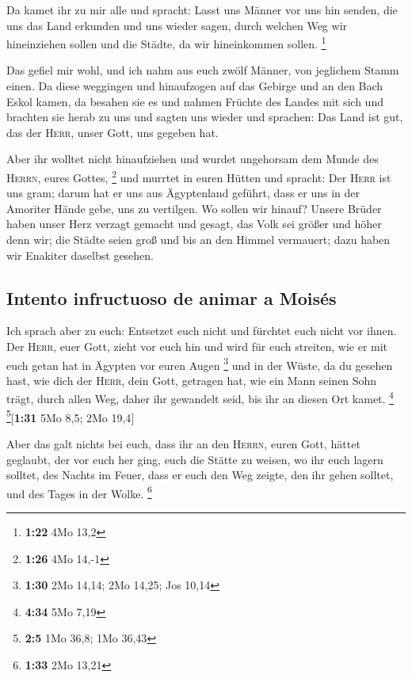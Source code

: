  Da kamet ihr zu mir alle und spracht: Lasst uns Männer
vor uns hin senden, die uns das Land erkunden und uns wieder sagen,
durch welchen Weg wir hineinziehen sollen und die Städte, da wir
hineinkommen sollen. \footnote{\textbf{1:22} 4Mo 13,2}

 Das gefiel mir wohl, und ich nahm aus euch zwölf Männer,
von jeglichem Stamm einen.  Da diese weggingen und
hinaufzogen auf das Gebirge und an den Bach Eskol kamen, da besahen sie
es  und nahmen Früchte des Landes mit sich und brachten
sie herab zu uns und sagten uns wieder und sprachen: Das Land ist gut,
das der \textsc{Herr}, unser Gott, uns gegeben hat.

 Aber ihr wolltet nicht hinaufziehen und wurdet
ungehorsam dem Munde des \textsc{Herrn}, eures Gottes, \footnote{\textbf{1:26}
  4Mo 14,-1}  und murrtet in euren Hütten und spracht:
Der \textsc{Herr} ist uns gram; darum hat er uns aus Ägyptenland
geführt, dass er uns in der Amoriter Hände gebe, uns zu vertilgen.
 Wo sollen wir hinauf? Unsere Brüder haben unser Herz
verzagt gemacht und gesagt, das Volk sei größer und höher denn wir; die
Städte seien groß und bis an den Himmel vermauert; dazu haben wir
Enakiter daselbst gesehen.

\hypertarget{intento-infructuoso-de-animar-a-moisuxe9s}{%
\subsection{Intento infructuoso de animar a
Moisés}\label{intento-infructuoso-de-animar-a-moisuxe9s}}

 Ich sprach aber zu euch: Entsetzet euch nicht und
fürchtet euch nicht vor ihnen.  Der \textsc{Herr}, euer
Gott, zieht vor euch hin und wird für euch streiten, wie er mit euch
getan hat in Ägypten vor euren Augen \footnote{\textbf{1:30} 2Mo 14,14;
  2Mo 14,25; Jos 10,14}  und in der Wüste, da du gesehen
hast, wie dich der \textsc{Herr}, dein Gott, getragen hat, wie ein Mann
seinen Sohn trägt, durch allen Weg, daher ihr gewandelt seid, bis ihr an
diesen Ort kamet. \footnote{\textbf{4:34} 5Mo 7,19}
\footnote{\textbf{2:5} 1Mo 36,8; 1Mo 36,43}{[}\textbf{1:31} 5Mo 8,5; 2Mo
19,4{]}

 Aber das galt nichts bei euch, dass ihr an den
\textsc{Herrn}, euren Gott, hättet geglaubt,  der vor
euch her ging, euch die Stätte zu weisen, wo ihr euch lagern solltet,
des Nachts im Feuer, dass er euch den Weg zeigte, den ihr gehen solltet,
und des Tages in der Wolke. \footnote{\textbf{1:33} 2Mo 13,21}

